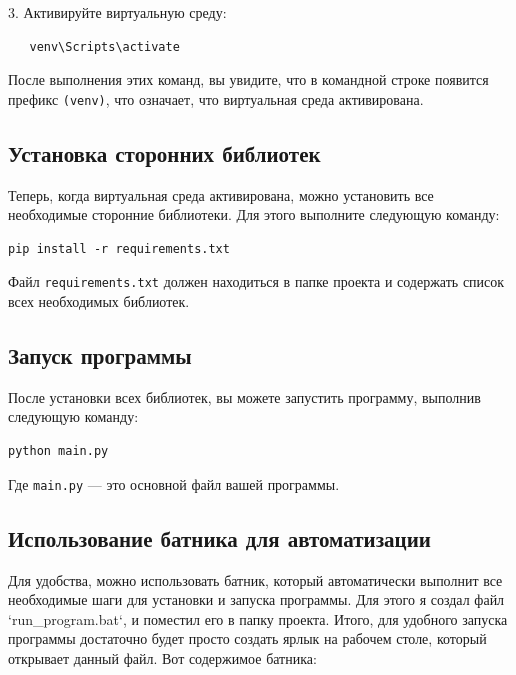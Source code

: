 \documentclass{article}
\begin{document}
3. Активируйте виртуальную среду:
   \begin{verbatim}
   venv\Scripts\activate
   \end{verbatim}

После выполнения этих команд, вы увидите, что в командной строке появится префикс \texttt{(venv)}, что означает, что виртуальная среда активирована.

\subsection{Установка сторонних библиотек}
Теперь, когда виртуальная среда активирована, можно установить все необходимые сторонние библиотеки. Для этого выполните следующую команду:

\begin{verbatim}
pip install -r requirements.txt
\end{verbatim}

Файл \texttt{requirements.txt} должен находиться в папке проекта и содержать список всех необходимых библиотек.

\subsection{Запуск программы}
После установки всех библиотек, вы можете запустить программу, выполнив следующую команду:

\begin{verbatim}
python main.py
\end{verbatim}

Где \texttt{main.py} — это основной файл вашей программы.

\subsection{Использование батника для автоматизации}
Для удобства, можно использовать батник, который автоматически выполнит все необходимые шаги для установки и запуска программы. Для этого я создал файл `run\_program.bat`, и поместил его в папку проекта. Итого, для удобного запуска программы достаточно будет просто создать ярлык на рабочем столе, который открывает данный файл. Вот содержимое батника:
\end{document}
